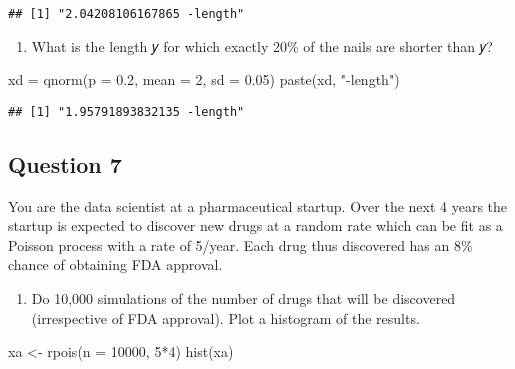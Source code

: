 \documentclass[
]{article}
\newenvironment{Shaded}{\begin{snugshade}}{\end{snugshade}}
\newcommand{\AttributeTok}[1]{\textcolor[rgb]{0.77,0.63,0.00}{#1}}
\newcommand{\DecValTok}[1]{\textcolor[rgb]{0.00,0.00,0.81}{#1}}
\newcommand{\FloatTok}[1]{\textcolor[rgb]{0.00,0.00,0.81}{#1}}
\newcommand{\FunctionTok}[1]{\textcolor[rgb]{0.00,0.00,0.00}{#1}}
\newcommand{\NormalTok}[1]{#1}
\newcommand{\OtherTok}[1]{\textcolor[rgb]{0.56,0.35,0.01}{#1}}
\newcommand{\SpecialCharTok}[1]{\textcolor[rgb]{0.00,0.00,0.00}{#1}}
\newcommand{\StringTok}[1]{\textcolor[rgb]{0.31,0.60,0.02}{#1}}
\providecommand{\tightlist}{%
  \setlength{\itemsep}{0pt}\setlength{\parskip}{0pt}}
\begin{document}
\begin{verbatim}
## [1] "2.04208106167865 -length"
\end{verbatim}

\begin{enumerate}
\def\labelenumi{\alph{enumi}.}
\setcounter{enumi}{3}
\tightlist
\item
  What is the length 𝑦 for which exactly 20\% of the nails are shorter
  than 𝑦?
\end{enumerate}

\begin{Shaded}
\begin{Highlighting}[]
\NormalTok{xd }\OtherTok{=} \FunctionTok{qnorm}\NormalTok{(}\AttributeTok{p =} \FloatTok{0.2}\NormalTok{, }\AttributeTok{mean =} \DecValTok{2}\NormalTok{, }\AttributeTok{sd =} \FloatTok{0.05}\NormalTok{)}
\FunctionTok{paste}\NormalTok{(xd, }\StringTok{"{-}length"}\NormalTok{)  }
\end{Highlighting}
\end{Shaded}

\begin{verbatim}
## [1] "1.95791893832135 -length"
\end{verbatim}

\hypertarget{question-7}{%
\subsection{Question 7}\label{question-7}}

You are the data scientist at a pharmaceutical startup. Over the next 4
years the startup is expected to discover new drugs at a random rate
which can be fit as a Poisson process with a rate of 5/year. Each drug
thus discovered has an 8\% chance of obtaining FDA approval.

\begin{enumerate}
\def\labelenumi{\alph{enumi}.}
\tightlist
\item
  Do 10,000 simulations of the number of drugs that will be discovered
  (irrespective of FDA approval). Plot a histogram of the results.
\end{enumerate}

\begin{Shaded}
\begin{Highlighting}[]
\NormalTok{xa }\OtherTok{\textless{}{-}} \FunctionTok{rpois}\NormalTok{(}\AttributeTok{n =} \DecValTok{10000}\NormalTok{, }\DecValTok{5}\SpecialCharTok{*}\DecValTok{4}\NormalTok{)}
\FunctionTok{hist}\NormalTok{(xa)}
\end{Highlighting}
\end{Shaded}
\end{document}
